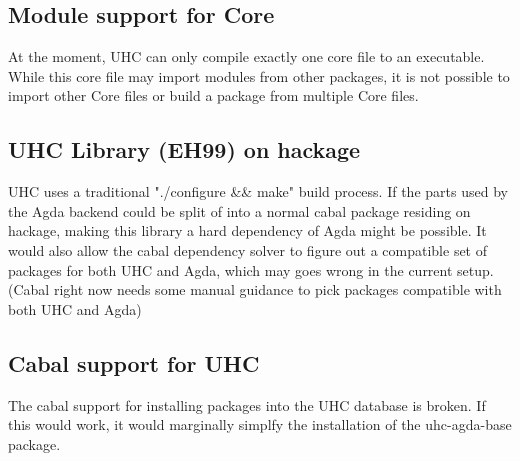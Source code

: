 \documentclass[12pt, a4paper, twoside]{report}
\begin{document}
\subsection{Module support for Core}
At the moment, UHC can only compile exactly one core file to an executable.
While this core file may import modules from other packages, it is not possible
to import other Core files or build a package from multiple Core files.

\subsection{UHC Library (EH99) on hackage}
UHC uses a traditional "./configure \&\& make" build process. If the parts used by the
Agda backend could be split of into a normal cabal package residing on hackage,
making this library a hard dependency of Agda might be possible.
It would also allow the cabal dependency solver to figure out a compatible
set of packages for both UHC and Agda, which may goes wrong in the current setup.
(Cabal right now needs some manual guidance to pick packages compatible with both UHC and Agda)

\subsection{Cabal support for UHC}
The cabal support for installing packages into the UHC database is broken. If this would work, it
would marginally simplfy the installation of the uhc-agda-base package.


{}

\end{document}
